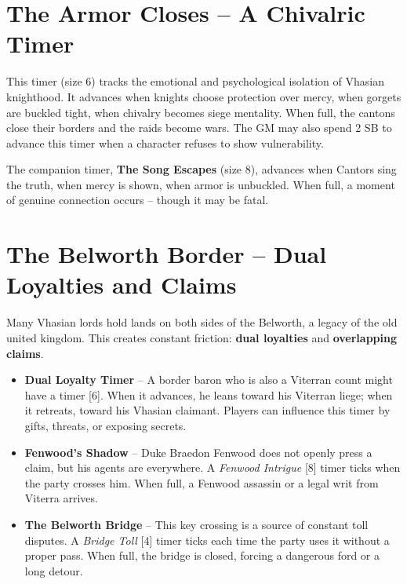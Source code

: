 \documentclass[11pt,twoside]{book}
\begin{document}
\section*{The Armor Closes -- A Chivalric Timer }

This timer (size 6) tracks the emotional and psychological isolation of Vhasian knighthood. It advances when knights choose protection over mercy, when gorgets are buckled tight, when chivalry becomes siege mentality. When full, the cantons close their borders and the raids become wars. The GM may also spend 2 SB to advance this timer when a character refuses to show vulnerability.

The companion timer, \textbf{The Song Escapes} (size 8), advances when Cantors sing the truth, when mercy is shown, when armor is unbuckled. When full, a moment of genuine connection occurs -- though it may be fatal.

\section*{The Belworth Border -- Dual Loyalties and Claims}

Many Vhasian lords hold lands on both sides of the Belworth, a legacy of the old united kingdom. This creates constant friction: \textbf{dual loyalties} and \textbf{overlapping claims}.

\begin{itemize}
    \item \textbf{Dual Loyalty Timer } -- A border baron who is also a Viterran count might have a timer [6]. When it advances, he leans toward his Viterran liege; when it retreats, toward his Vhasian claimant. Players can influence this timer by gifts, threats, or exposing secrets.
    \item \textbf{Fenwood's Shadow} -- Duke Braedon Fenwood does not openly press a claim, but his agents are everywhere. A \textit{Fenwood Intrigue} [8] timer ticks when the party crosses him. When full, a Fenwood assassin or a legal writ from Viterra arrives.
    \item \textbf{The Belworth Bridge} -- This key crossing is a source of constant toll disputes. A \textit{Bridge Toll} [4] timer ticks each time the party uses it without a proper pass. When full, the bridge is closed, forcing a dangerous ford or a long detour.
\end{itemize}
\end{document}
